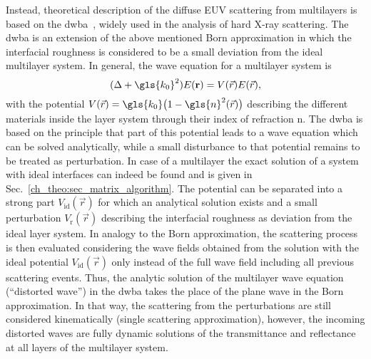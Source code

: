 Instead, theoretical description of the diffuse EUV scattering from multilayers is based on the \gls{dwba}~\cite{holy_nonspecular_1994,holy_x-ray_1993}, widely used in the analysis of hard X-ray scattering. The \gls{dwba} is an extension of the above mentioned Born approximation in which the interfacial roughness is considered to be a small deviation from the ideal multilayer system. In general, the wave equation for a multilayer system is
\begin{equation}
        (\Delta + \gls{k_0}^2) E(\mathbf{r}) = V(\vec{r}) E(\vec{r})\text{,} \label{ch_theo:eqn_multilayer_wave_equation} 
\end{equation}
with the potential $V(\vec{r}) = \gls{k_0}\big(1-\gls{n}^2(\vec{r})\big)$ \cite{pietsch_high-resolution_2004} describing the different materials inside the layer system through their index of refraction \gls{n}. The \gls{dwba} is based on the principle that part of this potential leads to a wave equation which can be solved analytically, while a small disturbance to that potential remains to be treated as perturbation. In case of a multilayer the exact solution of a system with ideal interfaces can indeed be found and is given in Sec.~\ref{ch_theo:sec_matrix_algorithm}. The potential can be separated into a strong part $V_\text{id}(\vec{r})$ for which an analytical solution exists and a small perturbation $V_\text{r}(\vec{r})$ describing the interfacial roughness as deviation from the ideal layer system. In analogy to the Born approximation, the scattering process is then evaluated considering the wave fields obtained from the solution with the ideal potential $V_\text{id}(\vec{r})$ only instead of the full wave field including all previous scattering events. Thus, the analytic solution of the multilayer wave equation (``distorted wave'') in the \gls{dwba} takes the place of the plane wave in the Born approximation. In that way, the scattering from the perturbations are still considered kinematically (single scattering approximation), however, the incoming distorted waves are fully dynamic solutions of the transmittance and reflectance at all layers of the multilayer system.





